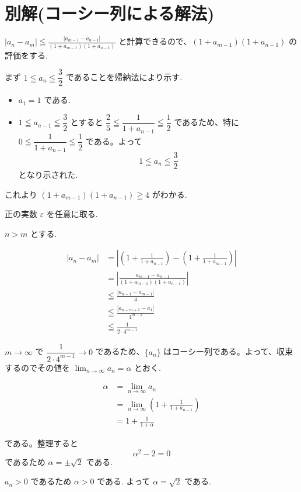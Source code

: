 \documentclass[a4paper,11pt]{jsarticle}
\begin{document}


\newpage

\section*{別解(コーシー列による解法)}

\vspace{1em}
\noindent
$\displaystyle |a_n - a_m| \leqq \frac{|a_{m-1} - a_{n-1}|}{(1 + a_{m-1})(1 + a_{n-1})}$
と計算できるので、$(1 + a_{m-1})(1 + a_{n-1})$ の評価をする.
\vspace{1em}

まず $1 \leqq a_n \leqq \dfrac{3}{2}$ であることを帰納法により示す.

\begin{itemize}
    \item $a_1 = 1$ である.
    \item $1 \leqq a_{n-1} \leqq \dfrac{3}{2}$ とすると $\dfrac{2}{5} \leqq \dfrac{1}{1 + a_{n-1}} \leqq \dfrac{1}{2}$ であるため、特に $0 \leqq \dfrac{1}{1 + a_{n-1}} \leqq \dfrac{1}{2}$ である。よって
    \[
    1 \leqq a_n \leqq \frac{3}{2}
    \]
    となり示された.
\end{itemize}

これより $(1 + a_{m-1})(1 + a_{n-1}) \geqq 4$ がわかる.

正の実数 $\varepsilon$ を任意に取る.

$n > m$ とする.

\begin{align*}
|a_n - a_m| &= \left| \left( 1 + \frac{1}{1 + a_{n-1}} \right) - \left( 1 + \frac{1}{1 + a_{m-1}} \right) \right| \\
&= \left| \frac{a_{m-1} - a_{n-1}}{(1 + a_{m-1})(1 + a_{n-1})} \right| \\
&\leqq \frac{|a_{n-1} - a_{m-1}|}{4} \\
&\leqq \frac{|a_{n-m+1} - a_1|}{4^{m-1}} \\
&\leqq \frac{1}{2 \cdot 4^{m-1}}
\end{align*}

$m \to \infty$ で $\dfrac{1}{2 \cdot 4^{m-1}} \to 0$ であるため、$\{a_n\}$ はコーシー列である。よって、収束するのでその値を $\lim_{n\to\infty} a_n = \alpha$ とおく.

\begin{align*}
\alpha &= \lim_{n\to\infty} a_{n} \\
&= \lim_{n\to\infty} \left( 1 + \frac{1}{1 + a_{n-1}} \right) \\
&= 1 + \frac{1}{1 + \alpha}
\end{align*}

である。整理すると
\[
\alpha^2 - 2 = 0
\]
であるため $\alpha = \pm\sqrt{2}$ である.

$a_n > 0$ であるため $\alpha > 0$ である. よって $\alpha = \sqrt{2}$ である.
\end{document}
